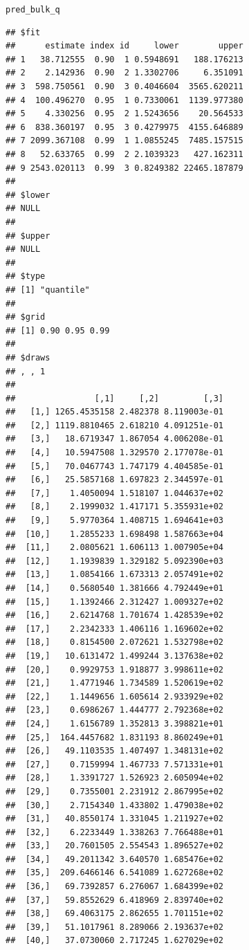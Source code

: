 \documentclass[article]{jss}\usepackage[]{graphicx}\usepackage[]{xcolor}
\makeatletter
\newcommand{\hldef}[1]{\textcolor[rgb]{0.345,0.345,0.345}{#1}}%
\newenvironment{kframe}{%
 \def\at@end@of@kframe{}%
 \ifinner\ifhmode%
  \def\at@end@of@kframe{\end{minipage}}%
  \begin{minipage}{\columnwidth}%
 \fi\fi%
 \def\FrameCommand##1{\hskip\@totalleftmargin \hskip-\fboxsep
 \colorbox{shadecolor}{##1}\hskip-\fboxsep
     \hskip-\linewidth \hskip-\@totalleftmargin \hskip\columnwidth}%
 \MakeFramed {\advance\hsize-\width
   \@totalleftmargin\z@ \linewidth\hsize
   \@setminipage}}%
 {\par\unskip\endMakeFramed%
 \at@end@of@kframe}
\newenvironment{knitrout}{}{} %
\makeatother
\begin{document}
\begin{knitrout}
\begin{kframe}
\begin{alltt}
\hldef{pred_bulk_q}
\end{alltt}
\begin{verbatim}
## $fit
##      estimate index id     lower        upper
## 1   38.712555  0.90  1 0.5948691   188.176213
## 2    2.142936  0.90  2 1.3302706     6.351091
## 3  598.750561  0.90  3 0.4046604  3565.620211
## 4  100.496270  0.95  1 0.7330061  1139.977380
## 5    4.330256  0.95  2 1.5243656    20.564533
## 6  838.360197  0.95  3 0.4279975  4155.646889
## 7 2099.367108  0.99  1 1.0855245  7485.157515
## 8   52.633765  0.99  2 2.1039323   427.162311
## 9 2543.020113  0.99  3 0.8249382 22465.187879
## 
## $lower
## NULL
## 
## $upper
## NULL
## 
## $type
## [1] "quantile"
## 
## $grid
## [1] 0.90 0.95 0.99
## 
## $draws
## , , 1
## 
##                [,1]     [,2]         [,3]
##   [1,] 1265.4535158 2.482378 8.119003e-01
##   [2,] 1119.8810465 2.618210 4.091251e-01
##   [3,]   18.6719347 1.867054 4.006208e-01
##   [4,]   10.5947508 1.329570 2.177078e-01
##   [5,]   70.0467743 1.747179 4.404585e-01
##   [6,]   25.5857168 1.697823 2.344597e-01
##   [7,]    1.4050094 1.518107 1.044637e+02
##   [8,]    2.1999032 1.417171 5.355931e+02
##   [9,]    5.9770364 1.408715 1.694641e+03
##  [10,]    1.2855233 1.698498 1.587663e+04
##  [11,]    2.0805621 1.606113 1.007905e+04
##  [12,]    1.1939839 1.329182 5.092390e+03
##  [13,]    1.0854166 1.673313 2.057491e+02
##  [14,]    0.5680540 1.381666 4.792449e+01
##  [15,]    1.1392466 2.312427 1.009327e+02
##  [16,]    2.6214768 1.701674 1.428539e+02
##  [17,]    2.2342333 1.406116 1.169602e+02
##  [18,]    0.8154500 2.072621 1.532798e+02
##  [19,]   10.6131472 1.499244 3.137638e+02
##  [20,]    0.9929753 1.918877 3.998611e+02
##  [21,]    1.4771946 1.734589 1.520619e+02
##  [22,]    1.1449656 1.605614 2.933929e+02
##  [23,]    0.6986267 1.444777 2.792368e+02
##  [24,]    1.6156789 1.352813 3.398821e+01
##  [25,]  164.4457682 1.831193 8.860249e+01
##  [26,]   49.1103535 1.407497 1.348131e+02
##  [27,]    0.7159994 1.467733 7.571331e+01
##  [28,]    1.3391727 1.526923 2.605094e+02
##  [29,]    0.7355001 2.231912 2.867995e+02
##  [30,]    2.7154340 1.433802 1.479038e+02
##  [31,]   40.8550174 1.331045 1.211927e+02
##  [32,]    6.2233449 1.338263 7.766488e+01
##  [33,]   20.7601505 2.554543 1.896527e+02
##  [34,]   49.2011342 3.640570 1.685476e+02
##  [35,]  209.6466146 6.541089 1.627268e+02
##  [36,]   69.7392857 6.276067 1.684399e+02
##  [37,]   59.8552629 6.418969 2.839740e+02
##  [38,]   69.4063175 2.862655 1.701151e+02
##  [39,]   51.1017961 8.289066 2.193637e+02
##  [40,]   37.0730060 2.717245 1.627029e+02

\end{verbatim}
\end{kframe}
\end{knitrout}
\end{document}
